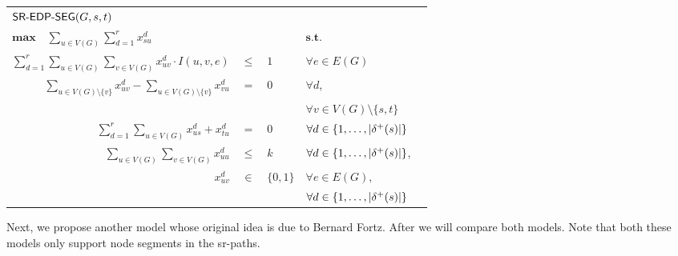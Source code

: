 \begin{center}
\begin{tabular}{rcllr}
\multicolumn{5}{l}{$\textsf{SR-EDP-SEG}(G, s, t)$} \\[0.5cm] 
\multicolumn{3}{l}{$\mathbf{max} \quad \displaystyle \sum_{u \in V(G)} \sum_{d = 1}^r x^d_{su}$} & $\textbf{s.t.}$ & \\[0.5cm]
$\displaystyle \sum_{d = 1}^r \sum_{u \in V(G)} \sum_{v \in V(G)}  x^d_{uv} \cdot I(u, v, e)$ & $\leq$ & $1$ & $\forall e \in E(G)$ & \\[0.5cm]
$\displaystyle \sum_{u \in V(G) \setminus \{ v \}} x^d_{uv} - \sum_{u \in V(G) \setminus \{ v \}} x^d_{vu}$ & $=$    &  $0$ & $\forall d$, & \\[-0.2cm]
& & & $\forall v \in V(G) \setminus \{ s, t \}$ & \\[0.5cm]
$\displaystyle \sum_{d = 1}^r \sum_{u \in V(G) } x^d_{us} + x^d_{tu}$ & $=$    &  $0$ & $\forall d \in \{1, \ldots, |\delta^+(s)|\}$ \\[0.5cm] 
$\displaystyle \sum_{u \in V(G)} \sum_{v \in V(G)} x^d_{uu}$ & $\leq$    &  $k$ & $\forall d \in \{ 1, \ldots, |\delta^+(s)| \}$, \\[0.5cm]
$x^d_{uv}$  &    $\in$    &  $\{0, 1\}$  & $\forall e \in E(G),$ & \\
  &    &   & $\forall d \in \{1, \ldots, |\delta^+(s)|\}$ &
\end{tabular}
\end{center}

Next, we propose another model whose original idea is due to
Bernard Fortz. After we will compare both models. Note that both these models only support node segments
in the sr-paths.

